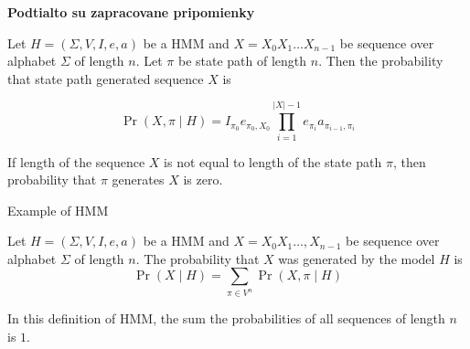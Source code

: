 \bigskip
{\large\bf Podtialto su zapracovane pripomienky}
\bigskip




\begin{definition}
Let $H=(\Sigma,V,I,e,a)$ be a HMM and $X=X_0X_1\dots X_{n-1}$ be sequence over
alphabet $\Sigma$ of length $n$. Let $\pi$ be state path of length $n$. Then the
probability that state path generated sequence $X$ is 

\[\Pr\left(X,\pi\mid H\right) =
I_{\pi_0}e_{\pi_0,X_0}\prod_{i=1}^{|X|-1}e_{\pi_i}a_{\pi_{i-1},\pi_i}\]

If length of the sequence $X$ is not equal to length of the state path $\pi$,
then
probability that $\pi$ generates $X$ is zero.
\end{definition}

\begin{example}
Example of HMM
\end{example}

\begin{definition}
Let $H=(\Sigma,V,I,e,a)$ be a HMM and $X=X_0X_1\dots,X_{n-1}$ be sequence over
alphabet $\Sigma$ of length $n$. The probability that $X$ was generated by the
model $H$ is 
\[\Pr\left(X\mid H\right)=\sum_{\pi\in V^n}\Pr\left(X,\pi\mid H\right)\]
\end{definition}


\begin{note}
In this definition of HMM, the sum the probabilities of all sequences of length
$n$ is $1$.
\end{note}

